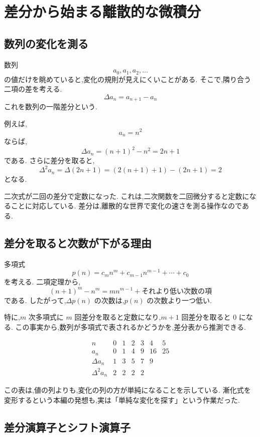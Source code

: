 
\section{差分から始まる離散的な微積分}

\subsection{数列の変化を測る}

数列
\[
  a_0,a_1,a_2,\ldots
\]
の値だけを眺めていると,変化の規則が見えにくいことがある.
そこで,隣り合う二項の差を考える.
\[
  \Delta a_n=a_{n+1}-a_n
\]
これを数列の一階差分という.

例えば,
\[
  a_n=n^2
\]
ならば,
\[
  \Delta a_n=(n+1)^2-n^2=2n+1
\]
である.
さらに差分を取ると,
\[
  \Delta^2a_n
  =\Delta(2n+1)
  =(2(n+1)+1)-(2n+1)=2
\]
となる.

二次式が二回の差分で定数になった.
これは,二次関数を二回微分すると定数になることに対応している.
差分は,離散的な世界で変化の速さを測る操作なのである.

\subsection{差分を取ると次数が下がる理由}

多項式
\[
  p(n)=c_mn^m+c_{m-1}n^{m-1}+\cdots+c_0
\]
を考える.
二項定理から,
\[
  (n+1)^m-n^m
  =mn^{m-1}+\text{それより低い次数の項}
\]
である.
したがって,$\Delta p(n)$ の次数は,$p(n)$ の次数より一つ低い.

特に,$m$ 次多項式に $m$ 回差分を取ると定数になり,$m+1$ 回差分を取ると $0$ になる.
この事実から,数列が多項式で表されるかどうかを,差分表から推測できる.

\[
  \begin{array}{c|cccccc}
    n           & 0 & 1 & 2 & 3 & 4  & 5  \\ \hline
    a_n         & 0 & 1 & 4 & 9 & 16 & 25 \\
    \Delta a_n  & 1 & 3 & 5 & 7 & 9  &    \\
    \Delta^2a_n & 2 & 2 & 2 & 2 &    &
  \end{array}
\]

この表は,値の列よりも,変化の列の方が単純になることを示している.
漸化式を変形するという本編の発想も,実は「単純な変化を探す」という作業だった.

\subsection{差分演算子とシフト演算子}

